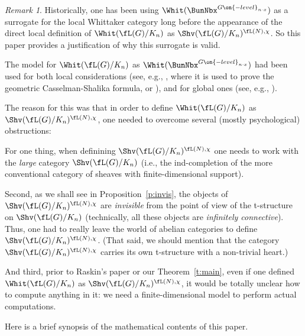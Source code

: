 \documentclass[9pt]{amsart}
\theoremstyle{definition}
\theoremstyle{remark}
\newtheorem{rem}[subsubsection]{Remark}
\newcommand{\thmref}[1]{Theorem~\ref{#1}}
\newcommand{\propref}[1]{Proposition~\ref{#1}}
\numberwithin{equation}{section}
\begin{document}
\begin{rem}
Historically, one has been using $\Whit(\BunNbx^{G\on{-level}_{n\cdot x}})$ as a surrogate for the local Whittaker category 
long before the appearance of the direct local definition of $\Whit(\fL(G)/K_n)$ as $\Shv(\fL(G)/K_n)^{\fL(N),\chi}$. So this paper 
provides a justification of why this surrogate is valid. 

\medskip

The model for $\Whit(\fL(G)/K_n)$ as $\Whit(\BunNbx^{G\on{-level}_{n\cdot x}})$
had been used for both local considerations (see, e.g., \cite{FGV}, where it is used to prove the geometric 
Casselman-Shalika formula, or \cite{Ga3}), and for global ones (see, e.g., \cite{FGKV,Ga4,Ga5}). 

\medskip

The reason for this was that in order to define $\Whit(\fL(G)/K_n)$ as $\Shv(\fL(G)/K_n)^{\fL(N),\chi}$, one needed to
overcome several (mostly psychological) obstructions: 

\medskip

For one thing, when definining $\Shv(\fL(G)/K_n)^{\fL(N),\chi}$ one needs to work with the \emph{large} category
$\Shv(\fL(G)/K_n)$ (i.e., the ind-completion of the more conventional category of sheaves with finite-dimensional
support). 

\medskip

Second, as we shall see in \propref{p:invis}, the objects of $\Shv(\fL(G)/K_n)^{\fL(N),\chi}$ are \emph{invisible}
from the point of view of the t-structure on $\Shv(\fL(G)/K_n)$ (technically, all these objects are \emph{infinitely connective}).
Thus, one had to really leave the world of abelian categories to define $\Shv(\fL(G)/K_n)^{\fL(N),\chi}$. (That said, we should
mention that the category $\Shv(\fL(G)/K_n)^{\fL(N),\chi}$ carries its own t-structure with a non-trivial heart.)

\medskip

And third, prior to Raskin's paper or our \thmref{t:main}, even if one defined $\Whit(\fL(G)/K_n)$ as $\Shv(\fL(G)/K_n)^{\fL(N),\chi}$,
it would be totally unclear how to compute anything in it: we need a finite-dimensional model to perform actual computations.

\end{rem}


Here is a brief synopsis of the mathematical contents of this paper. 
\end{document}
